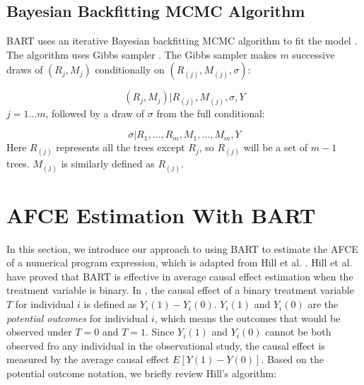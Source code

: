 \subsection{Bayesian Backfitting MCMC Algorithm}
BART uses an iterative Bayesian backfitting  MCMC algorithm to fit the model \cite{gilks2005markov}. The algorithm uses Gibbs sampler \cite{casella1992explaining}. The Gibbs sampler makes $m$ successive draws of $(R_j, M_j)$ conditionally on $(R_{(j)}, M_{(j)}, \sigma)$:

\begin{equation*}
(R_j,M_j)|R_{(j)}, M_{(j)}, \sigma, Y
\end{equation*}
$j=1 \ldots m$, followed by a draw of $\sigma$ from the full conditional:

\begin{equation*}
\sigma |{R_1}, \ldots ,{R_m},{M_1}, \ldots ,{M_m},Y
\end{equation*}
Here $R_{(j)}$ represents all the trees except $R_j$, so $R_{(j)}$ will be a set of $m-1$ trees. $M_{(j)}$ is similarly defined as $R_{(j)}$.

\section{AFCE Estimation With BART}\label{BARTafce}%

In this section, we introduce our approach to using BART to estimate the AFCE of a numerical program expression, which is adapted from Hill et al. \cite{hill2012bayesian}. Hill et al. have proved that BART is effective in average causal effect estimation when the treatment variable is binary. In \cite{hill2012bayesian}, the causal effect of a binary treatment variable $T$ for individual $i$ is defined as $Y_i(1)-Y_i(0)$. $Y_i(1)$ and $Y_i(0)$ are the {\it potential outcomes} for individual $i$, which means the outcomes that would be observed under $T=0$ and $T=1$. Since $Y_i(1)$ and $Y_i(0)$ cannot be both observed fro any individual in the observational study, the causal effect is measured by the average causal effect $E[Y(1)-Y(0)]$.  Based on the potential outcome notation, we briefly review Hill’s algorithm:


